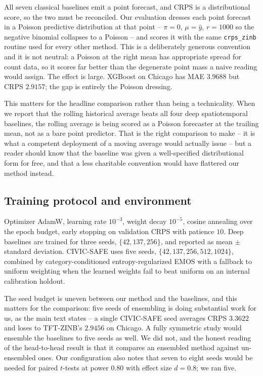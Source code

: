 \documentclass[journal,10pt,onecolumn]{IEEEtran}
\begin{document}
All seven classical baselines emit a point forecast, and CRPS is a
distributional score, so the two must be reconciled. Our evaluation dresses each
point forecast in a Poisson predictive distribution at that point --
$\pi = 0$, $\mu = \hat{y}$, $r = 1000$ so the negative binomial collapses to a
Poisson -- and scores it with the same \texttt{crps\_zinb} routine used for every
other method. This is a deliberately generous convention and it is not neutral: a
Poisson at the right mean has appropriate spread for count data, so it scores far
better than the degenerate point mass a naive reading would assign. The effect is
large. XGBoost on Chicago has MAE $3.9688$ but CRPS $2.9157$; the gap is entirely
the Poisson dressing.

This matters for the headline comparison rather than being a technicality. When we
report that the rolling historical average beats all four deep spatiotemporal
baselines, the rolling average is being scored as a Poisson forecaster at the
trailing mean, not as a bare point predictor. That is the right comparison to make
-- it is what a competent deployment of a moving average would actually issue --
but a reader should know that the baseline was given a well-specified
distributional form for free, and that a less charitable convention would have
flattered our method instead.

\subsection{Training protocol and environment}
\label{sec:s3-protocol}

Optimizer AdamW, learning rate $10^{-3}$, weight decay $10^{-5}$, cosine
annealing over the epoch budget, early stopping on validation CRPS with patience
$10$. Deep baselines are trained for three seeds, $\{42, 137, 256\}$, and reported
as mean $\pm$ standard deviation. CIVIC-SAFE uses five seeds,
$\{42, 137, 256, 512, 1024\}$, combined by category-conditioned
entropy-regularized EMOS with a fallback to uniform weighting when the learned
weights fail to beat uniform on an internal calibration holdout.

The seed budget is uneven between our method and the baselines, and this matters
for the comparison: five seeds of ensembling is doing substantial work for us, as
the main text states -- a single CIVIC-SAFE seed averages CRPS $3.3622$ and loses
to TFT-ZINB's $2.9456$ on Chicago. A fully symmetric study would ensemble the
baselines to five seeds as well. We did not, and the honest reading of the
head-to-head result is that it compares an ensembled method against
un-ensembled ones. Our configuration also notes that seven to eight seeds would
be needed for paired $t$-tests at power $0.80$ with effect size $d = 0.8$; we ran
five.
\end{document}
